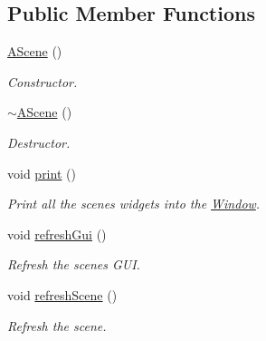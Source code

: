 \subsection*{Public Member Functions}
\begin{DoxyCompactItemize}
\item 
\mbox{\label{classAScene_ad0eacf691dbc8240fdf3a42d450c1042}} 
\hyperlink{classAScene_ad0eacf691dbc8240fdf3a42d450c1042}{A\+Scene} ()
\begin{DoxyCompactList}\small\item\em Constructor. \end{DoxyCompactList}\item 
\mbox{\label{classAScene_a9faf7f1a271327227e83627432d0b210}} 
\hyperlink{classAScene_a9faf7f1a271327227e83627432d0b210}{$\sim$\+A\+Scene} ()
\begin{DoxyCompactList}\small\item\em Destructor. \end{DoxyCompactList}\item 
\mbox{\label{classAScene_a0170b6a47bb2cc189bfacb432a0b4332}} 
void \hyperlink{classAScene_a0170b6a47bb2cc189bfacb432a0b4332}{print} ()
\begin{DoxyCompactList}\small\item\em Print all the scene\textquotesingle{}s widgets into the \hyperlink{classWindow}{Window}. \end{DoxyCompactList}\item 
\mbox{\label{classAScene_a39a67b761f9c0508f3f358f00fa941a1}} 
void \hyperlink{classAScene_a39a67b761f9c0508f3f358f00fa941a1}{refresh\+Gui} ()
\begin{DoxyCompactList}\small\item\em Refresh the scene\textquotesingle{}s G\+UI. \end{DoxyCompactList}\item 
\mbox{\label{classAScene_a94eb6d219e423c298a4c8339df47671c}} 
void \hyperlink{classAScene_a94eb6d219e423c298a4c8339df47671c}{refresh\+Scene} ()
\begin{DoxyCompactList}\small\item\em Refresh the scene. \end{DoxyCompactList}\item 

\end{DoxyCompactItemize}
